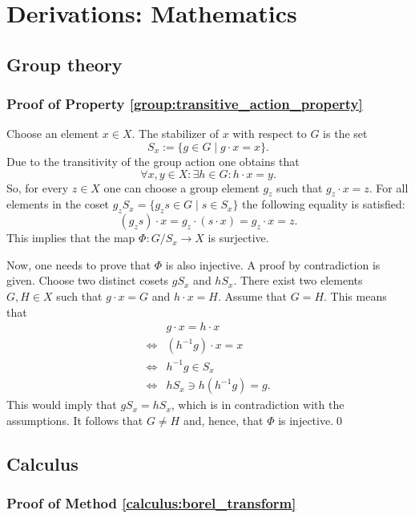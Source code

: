 \chapter{Derivations: Mathematics}

\section{Group theory}
\subsection{Proof of Property \ref{group:transitive_action_property}}\label{proof:stabilizer}

    Choose an element $x\in X$. The stabilizer of $x$ with respect to $G$ is the set \[S_x := \{g\in G\mid g\cdot x = x\}.\] Due to the transitivity of the group action one obtains that \[\forall x, y\in X: \exists h\in G: h\cdot x = y.\] So, for every $z\in X$ one can choose a group element $g_z$ such that $g_z\cdot x = z$. For all elements in the coset $g_zS_x = \{g_zs\in G\mid s\in S_x\}$ the following equality is satisfied: \[(g_zs)\cdot x = g_z\cdot (s\cdot x) = g_z\cdot x = z.\] This implies that the map $\Phi:G/S_x \rightarrow X$ is surjective.

    Now, one needs to prove that $\Phi$ is also injective. A proof by contradiction is given. Choose two distinct cosets $gS_x$ and $hS_x$. There exist two elements $G,H\in X$ such that $g\cdot x = G$ and $h\cdot x = H$. Assume that $G = H$. This means that
    \begin{align*}
        &g\cdot x = h\cdot x\\
        \iff&(h^{-1}g)\cdot x = x\\
        \iff&h^{-1}g\in S_x\\
        \iff&hS_x\ni h(h^{-1}g) = g.
    \end{align*}
    This would imply that $gS_x = hS_x$, which is in contradiction with the assumptions. It follows that $G\neq H$ and, hence, that $\Phi$ is injective.\qed

\section{Calculus}
\subsection{Proof of Method \ref{calculus:borel_transform}}

